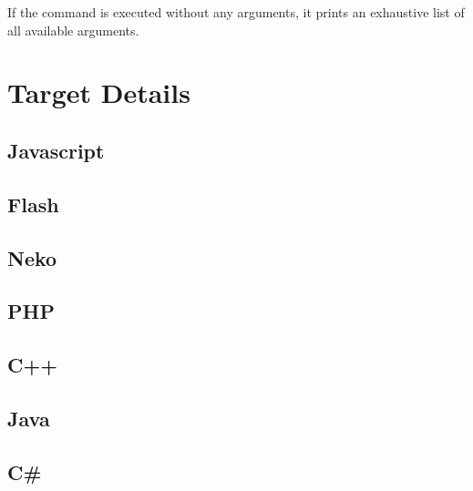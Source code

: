 \documentclass{haxe}
\begin{document}
If the  command is executed without any arguments, it prints an exhaustive list of all available arguments.



\chapter{Target Details}
\label{target-details}

\section{Javascript}
\label{target-javascript}

\section{Flash}
\label{target-flash}

\section{Neko}
\label{target-neko}

\section{PHP}
\label{target-php}

\section{C++}
\label{target-cpp}

\section{Java}
\label{target-java}

\section{C\#}
\label{target-cs}
\end{document}
